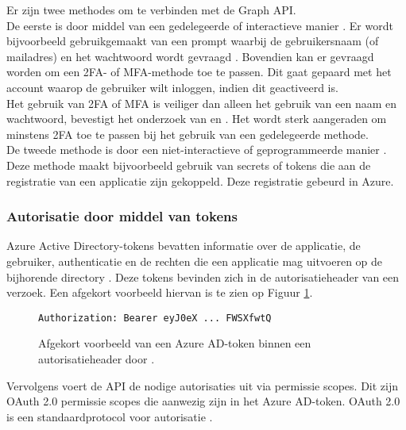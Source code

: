 Er zijn twee methodes om te verbinden met de Graph \ac{API}. \\

De eerste is door middel van een gedelegeerde of interactieve manier \autocite{Microsoft2023u}. Er wordt bijvoorbeeld gebruikgemaakt van een prompt waarbij de gebruikersnaam (of mailadres) en het wachtwoord wordt gevraagd \autocite{Bertocci2015}. Bovendien kan er gevraagd worden om een \ac{2FA}- of \ac{MFA}-methode toe te passen. Dit gaat gepaard met het account waarop de gebruiker wilt inloggen, indien dit geactiveerd is. \\

Het gebruik van \ac{2FA} of \ac{MFA} is veiliger dan alleen het gebruik van een naam en wachtwoord, bevestigt het onderzoek van \textcite{Gunson2011} en \textcite{Banyal2013}. Het wordt sterk aangeraden om minstens \ac{2FA} toe te passen bij het gebruik van een gedelegeerde methode. \\

De tweede methode is door een niet-interactieve of geprogrammeerde manier \autocite{Microsoft2023t}. Deze methode maakt bijvoorbeeld gebruik van secrets of tokens die aan de registratie van een applicatie zijn gekoppeld. Deze registratie gebeurd in Azure. 



\subsubsection{Autorisatie door middel van tokens}

Azure Active Directory-tokens bevatten informatie over de applicatie, de gebruiker, authenticatie en de rechten die een applicatie mag uitvoeren op de bijhorende directory \autocite{Microsoft2015}. Deze tokens bevinden zich in de autorisatieheader van een verzoek. Een afgekort voorbeeld hiervan is te zien op Figuur \ref{ahtoken}. \\

\begin{figure}[h]
    \scriptsize
    \begin{verbatim}
Authorization: Bearer eyJ0eX ... FWSXfwtQ
    \end{verbatim}    
    \caption[Voorbeeld Azure AD-token]{Afgekort voorbeeld van een Azure \Ac{AD}-token binnen een autorisatieheader door \textcite{Microsoft2015}.}
    \label{ahtoken}
\end{figure}

Vervolgens voert de \ac{API} de nodige autorisaties uit via permissie scopes. Dit zijn OAuth 2.0 permissie scopes die aanwezig zijn in het Azure \Ac{AD}-token. OAuth 2.0 is een standaardprotocol voor autorisatie \autocite{OAuth}. \\

